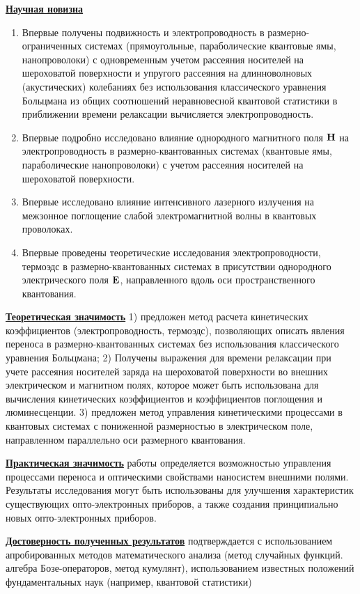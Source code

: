 \underline{\textbf{Научная новизна}}
\begin{enumerate}
	\item Впервые получены подвижность и электропроводность в размерно-ограниченных системах (прямоугольные, параболические квантовые ямы, нанопроволоки) с одновременным учетом рассеяния носителей на шероховатой поверхности и упругого рассеяния на длинноволновых (акустических) колебаниях без использования классического уравнения Больцмана из общих соотношений неравновесной квантовой статистики в приближении времени релаксации вычисляется электропроводность.
	\item Впервые подробно исследовано влияние однородного магнитного поля $\boldsymbol{\mathbf{H}}$ на электропроводность в размерно-квантованных системах (квантовые ямы, параболические нанопроволоки) с учетом рассеяния носителей на шероховатой поверхности.
	\item Впервые исследовано влияние интенсивного лазерного излучения на межзонное поглощение слабой электромагнитной волны в квантовых проволоках. 
	\item Впервые проведены теоретические исследования электропроводности, термоэдс в размерно-квантованных системах в присутствии однородного электрического поля $\boldsymbol{\mathbf{E}}$, направленного вдоль оси пространственного квантования.
\end{enumerate}

\underline{\textbf{Теоретическая значимость}} 1) предложен метод расчета кинетических коэффициентов (электропроводность, термоэдс), позволяющих описать явления переноса в размерно-квантованных системах без использования классического уравнения Больцмана;  2) Получены выражения для времени релаксации при учете рассеяния носителей заряда на шероховатой поверхности во внешних электрическом и магнитном полях, которое может быть использована для вычисления кинетических коэффициентов и коэффициентов поглощения и люминесценции. 3) предложен метод управления кинетическими процессами в квантовых системах с пониженной размерностью в электрическом поле, направленном параллельно оси размерного квантования. 

\underline{\textbf{Практическая значимость}} работы определяется возможностью управления процессами переноса и оптическими свойствами наносистем внешними полями. Результаты исследования могут быть использованы для улучшения характеристик существующих опто-электронных приборов, а также создания принципиально новых опто-электронных приборов.

\underline{\textbf{Достоверность полученных результатов}} подтверждается с использованием апробированных методов математического анализа (метод случайных функций. алгебра Бозе-операторов, метод кумулянт), использованием известных положений фундаментальных наук (например, квантовой статистики)

